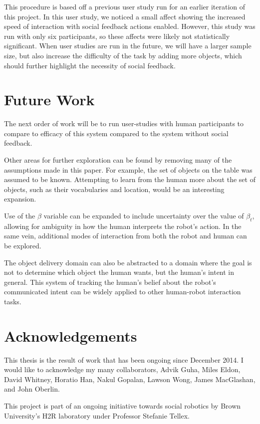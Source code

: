 \documentclass{article}
\begin{document}
\begin{multicols}{2}
This procedure is based off a previous user study run for an earlier iteration of this project. In this user study, we noticed a small affect showing the increased speed of interaction with social feedback actions enabled. However, this study was run with only six participants, so these affects were likely not statistically significant. When user studies are run in the future, we will have a larger sample size, but also increase the difficulty of the task by adding more objects, which should further highlight the necessity of social feedback. 


\section{Future Work}

The next order of work will be to run user-studies with human participants to compare to efficacy of this system compared to the system without social feedback. 

Other areas for further exploration can be found by removing many of the assumptions made in this paper. For example, the set of objects on the table was assumed to be known. Attempting to learn from the human more about the set of objects, such as their vocabularies and location, would be an interesting expansion. 

Use of the $\beta$ variable can be expanded to include uncertainty over the value of $\beta_t$, allowing for ambiguity in how the human interprets the robot's action. In the same vein, additional modes of interaction from both the robot and human can be explored. 

The object delivery domain can also be abstracted to a domain where the goal is not to determine which object the human wants, but the human's intent in general. This system of tracking the human's belief about the robot's communicated intent can be widely applied to other human-robot interaction tasks. 

\section{Acknowledgements}

This thesis is the result of work that has been ongoing since December 2014. I would like to acknowledge my many collaborators, Advik Guha, Miles Eldon, David Whitney, Horatio Han, Nakul Gopalan, Lawson Wong, James MacGlashan, and John Oberlin. 

This project is part of an ongoing initiative towards social robotics by Brown University's H2R laboratory under Professor Stefanie Tellex. 

\end{multicols}
\end{document}
